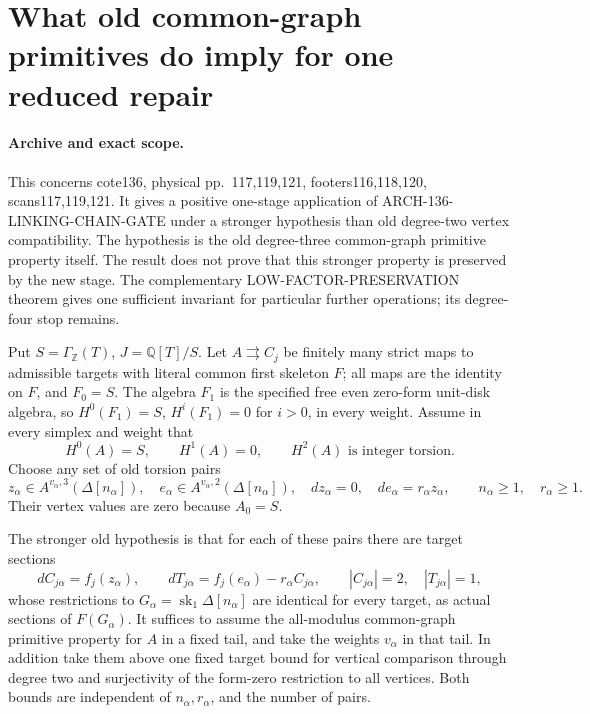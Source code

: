 \section{What old common-graph primitives do imply for one reduced repair}
\label{sec:136-old-graph-linking-repair}

\paragraph{Archive and exact scope.}
This concerns cote136, physical pp.~117,119,121,
footers116,118,120, scans117,119,121.  It gives a positive
one-stage application of ARCH-136-LINKING-CHAIN-GATE under
a stronger hypothesis than old degree-two vertex compatibility.
The hypothesis is the old degree-three common-graph primitive
property itself.  The result does not prove that this stronger
property is preserved by the new stage.  The complementary
LOW-FACTOR-PRESERVATION theorem gives one sufficient invariant
for particular further operations; its degree-four stop remains.

Put \(S=\Gamma_{\mathbb Z}(T)\),
\(J=\mathbb Q[T]/S\).  Let \(A\rightrightarrows C_j\)
be finitely many strict maps to admissible targets with literal
common first skeleton \(F\); all maps are the identity on
\(F\), and \(F_0=S\).  The algebra \(F_1\) is the
specified free even zero-form unit-disk algebra, so
\(H^0(F_1)=S\), \(H^i(F_1)=0\) for \(i>0\), in
every weight.  Assume in every simplex and weight that
\[
 H^0(A)=S,\qquad H^1(A)=0,\qquad
                         H^2(A)\text{ is integer torsion}.
                                                               \tag{136.OG1}
\]
Choose any set of old torsion pairs
\[
 z_\alpha\in A^{v_\alpha,3}(\Delta[n_\alpha]),\quad
 e_\alpha\in A^{v_\alpha,2}(\Delta[n_\alpha]),\quad
 dz_\alpha=0,\quad de_\alpha=r_\alpha z_\alpha,
              \qquad n_\alpha\geq1,\quad r_\alpha\geq1.
                                                               \tag{136.OG2}
\]
Their vertex values are zero because \(A_0=S\).

The stronger old hypothesis is that for each of these pairs
there are target sections
\[
 dC_{j\alpha}=f_j(z_\alpha),\qquad
 dT_{j\alpha}=f_j(e_\alpha)-r_\alpha C_{j\alpha},
       \qquad |C_{j\alpha}|=2,\quad |T_{j\alpha}|=1,
                                                               \tag{136.OG3}
\]
whose restrictions to
\(G_\alpha=\operatorname{sk}_1\Delta[n_\alpha]\)
are identical for every target, as actual sections of \(F(G_\alpha)\).
It suffices to assume the all-modulus common-graph primitive
property for \(A\) in a fixed tail, and take the weights
\(v_\alpha\) in that tail.  In addition take them above
one fixed target bound for vertical comparison through degree
two and surjectivity of the form-zero restriction to all vertices.
Both bounds are independent of \(n_\alpha,r_\alpha\), and
the number of pairs.

